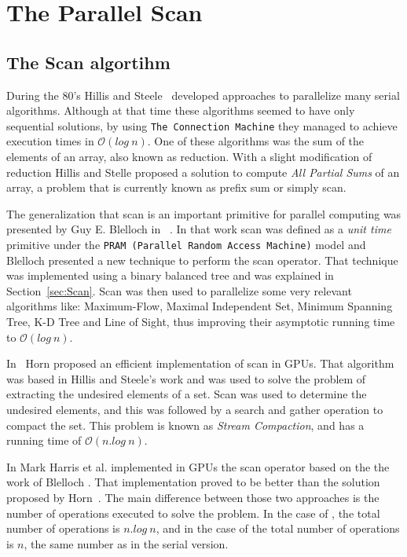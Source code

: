 \documentclass[Ingles]{ic-tese-v1}
\newcommand{\rsec}[1]{Section~\ref{sec:#1}}
\newcommand{\ttt}[1]{{\texttt{#1}}}
\begin{document}
\chapter{The Parallel Scan}
\label{cap:Scan}

\section{The Scan algortihm}
\label{sec:ScanAlg}

During  the 80's  Hillis and  Steele~\cite{dataparallel} developed
approaches to parallelize many serial  algorithms. Although at that time
these algorithms  seemed to have only  sequential solutions, by  using 
\ttt{The  Connection Machine}  \cite{themachine} they  managed to achieve
execution times in $\mathcal{O}(log\ n)$.  One of these algorithms was
the sum of  the elements of an  array, also known as  reduction.  With a
slight modification of reduction Hillis and Stelle proposed a solution
to compute \textit{All Partial Sums} of an array,  a problem that
is currently known as prefix sum or simply scan.

The generalization that scan is an important  primitive
for  parallel  computing  was  presented   by  Guy  E.   Blelloch  in
~\cite{ScanAsPrimitive}. In  that work scan was  defined as a
\textit{unit time}  primitive under the \texttt{PRAM  (Parallel Random
	Access Machine)}  model and  Blelloch presented  a new  technique to
perform  the scan  operator. That  technique was  implemented using  a
binary balanced tree  and was explained in  \rsec{Scan}.  Scan
was  then used   to  parallelize   some  very  relevant   algorithms  like:
Maximum-Flow, Maximal Independent Set, Minimum Spanning Tree, K-D Tree
and Line  of Sight,  thus improving their  asymptotic running  time to
$\mathcal{O}(log\ n)$.

In~\cite{GPUGems2}  Horn  proposed  an  efficient
implementation of  scan in GPUs.   That algorithm was based  in Hillis
and Steele's work and was used  to solve the problem of extracting the
undesired elements  of a set.  Scan  was used to
determine  the undesired elements, and this was followed by a search
and  gather   operation  to   compact the set.  This   problem  is   known  as
\textit{Stream   Compaction},  and has a running  time   of
$\mathcal{O}(n.log\ n)$.

In \cite{harris2007parallel} Mark Harris  et al.  implemented in GPUs the scan
operator     based     on     the     the     work     of     Blelloch
\cite{ScanAsPrimitive}. That  implementation proved to be  better than
the solution  proposed by  Horn~\cite{GPUGems2}.  The  main difference
between those two  approaches is the number of  operations executed to
solve the problem. In the case of \cite{GPUGems2}, the total number of
operations is $n.log\ n$, and in the case of \cite{harris2007parallel}
the  total number  of operations  is $n$,  the same  number as  in the
serial version.
\end{document}
